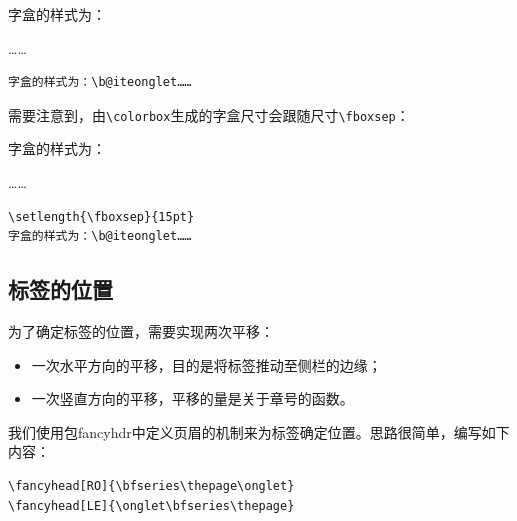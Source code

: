 
\newlength{\ongletwidth}
\newlength{\ongletheight}
\setlength{\ongletheight}{32pt}
\setlength{\ongletwidth}{.96cm}

\newcommand{\biteonglet}{%
    \colorbox[gray]{.7}{%
        \parbox[t][\ongletheight][s]{\ongletwidth}{%
            \vfill%
            \centering%
            \vfill}}}

\begin{codelist}[11.29]{
    字盒的样式为：\biteonglet……
}\begin{verbatim}
字盒的样式为：\b@iteonglet……
\end{verbatim}
\end{codelist}

需要注意到，由\verb|\colorbox|生成的字盒尺寸会跟随尺寸\verb|\fboxsep|：

\begin{codelist}[11.30]{
    \setlength{\fboxsep}{15pt}
    字盒的样式为：\biteonglet……
}\begin{verbatim}
\setlength{\fboxsep}{15pt}
字盒的样式为：\b@iteonglet……
\end{verbatim}
\end{codelist}

\subsection{标签的位置}

为了确定标签的位置，需要实现两次平移：

\begin{itemize}
    \item 一次水平方向的平移，目的是将标签推动至侧栏的边缘；
    \item 一次竖直方向的平移，平移的量是关于章号的函数。
\end{itemize}

我们使用包\textsf{fancyhdr}中定义页眉的机制来为标签确定位置。思路很简单，编写如下内容：

\begin{dmd}
\begin{verbatim}
\fancyhead[RO]{\bfseries\thepage\onglet}
\fancyhead[LE]{\onglet\bfseries\thepage}
\end{verbatim}
\end{dmd}

